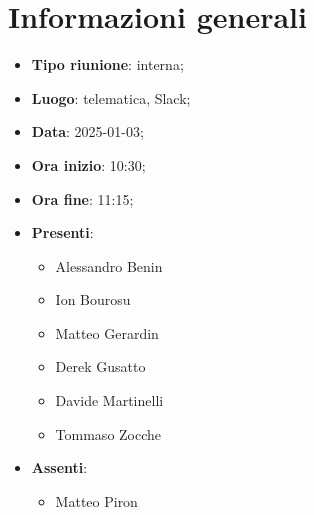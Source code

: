 \section{Informazioni generali}
\begin{itemize}
  \item \textbf{Tipo riunione}: interna;
  \item \textbf{Luogo}: telematica, Slack;
  \item \textbf{Data}: 2025-01-03;
  \item \textbf{Ora inizio}: 10:30;
  \item \textbf{Ora fine}: 11:15;
  
  \item \textbf{Presenti}:
  \begin{itemize}
    \item Alessandro Benin
    \item Ion Bourosu
    \item Matteo Gerardin
    \item Derek Gusatto
    \item Davide Martinelli
    \item Tommaso Zocche
  \end{itemize}

  \item \textbf{Assenti}:
  \begin{itemize}
      \item Matteo Piron
  \end{itemize}
  
\end{itemize}